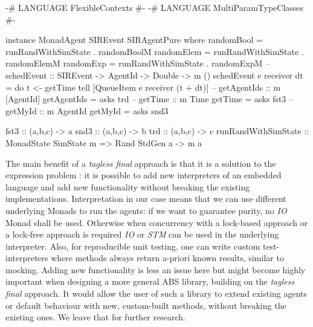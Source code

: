 \begin{HaskellCode}   
{-# LANGUAGE FlexibleContexts           #-}
{-# LANGUAGE MultiParamTypeClasses      #-}
      
instance MonadAgent SIREvent SIRAgentPure where
  randomBool = runRandWithSimState . randomBoolM
  randomElem = runRandWithSimState . randomElemM
  randomExp  = runRandWithSimState . randomExpM
  -- schedEvent :: SIREvent -> AgentId -> Double -> m ()
  schedEvent e receiver dt = do
    t <- getTime 
    tell [QueueItem e receiver (t + dt)]
  -- getAgentIds :: m [AgentId]
  getAgentIds = asks trd
  -- getTime :: m Time
  getTime = asks fst3
  -- getMyId :: m AgentId
  getMyId = asks snd3

fst3 :: (a,b,c) -> a
snd3 :: (a,b,c) -> b
trd :: (a,b,c) -> c
runRandWithSimState :: MonadState SimState m => Rand StdGen a -> m a
\end{HaskellCode}

The main benefit of a \textit{tagless final} approach is that it is a solution to the expression problem \cite{kiselyov_typed_2012}: it is possible to add new interpreters of an embedded language and add new functionality without breaking the existing implementations. Interpretation in our case means that we can use different underlying Monads to run the agents: if we want to guarantee purity, no \textit{IO} Monad shall be used. Otherwise when concurrency with a lock-based approach or a lock-free approach is required \textit{IO} or \textit{STM} can be used in the underlying interpreter. Also, for reproducible unit testing, one can write custom test-interpreters where methods always return a-priori known results, similar to mocking. Adding new functionality is less an issue here but might become highly important when designing a more general ABS library, building on the \textit{tagless final} approach. It would allow the user of such a library to extend existing agents or default behaviour with new, custom-built methods, without breaking the existing ones. We leave that for further research.